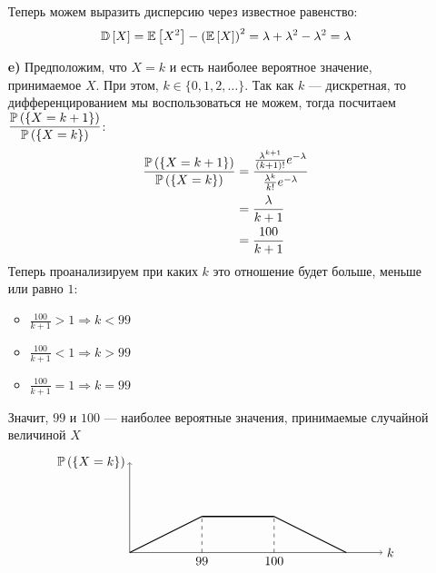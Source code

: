 \documentclass{article}
\begin{document}
\begin{enumerate}
    Теперь можем выразить дисперсию через известное равенство:
    \begin{equation*}
        \mathbb{D}\left[X\right]=\mathbb{E}\left[X^2\right]-\left(\mathbb{E}\left[X\right]\right)^2=\lambda+\lambda^2-\lambda^2=\lambda
    \end{equation*}
    \item[\textbf{e)}] Предположим, что $X=k$ и есть наиболее вероятное значение, принимаемое $X$. При этом, $k\in\{0,1,2,\ldots\}$. Так как $k$ — дискретная, то дифференцированием мы воспользоваться не можем, тогда посчитаем $\displaystyle\frac{\mathbb{P}\left(\{X=k+1\}\right)}{\mathbb{P}\left(\{X=k\}\right)}$:
    \begin{equation*}
        \begin{aligned}
            \frac{\mathbb{P}\left(\{X=k+1\}\right)}{\mathbb{P}\left(\{X=k\}\right)}&=\frac{\frac{\lambda^{k+1}}{(k+1)!}e^{-\lambda}}{\frac{\lambda^{k}}{k!}e^{-\lambda}}\\
            &=\frac{\lambda}{k+1}\\
            &=\frac{100}{k+1}
        \end{aligned}
    \end{equation*}
    Теперь проанализируем при каких $k$ это отношение будет больше, меньше или равно $1$:
    \begin{itemize}
        \item $\displaystyle\frac{100}{k+1}>1\Longrightarrow k <99$
        \item $\displaystyle\frac{100}{k+1}<1\Longrightarrow k >99$
        \item $\displaystyle\frac{100}{k+1}=1\Longrightarrow k =99$
    \end{itemize}
    Значит, $99$ и $100$ — наиболее вероятные значения, принимаемые случайной величиной $X$
    $$
    \begin{tikzpicture}
        \draw[black, ->] (0,0) -- (0,2.5) node[black, left] {$\prob{\{X=k\}}$};
        \draw[black, ->] (0,0) -- (7,0) node[black, right] {$k$};
        \draw[black, thick] (0,0) -- (2,1);
        \draw[black, very thick] (2,1) -- (4,1);
        \draw[black, thick] (4,1) -- (6,0);
        \draw[black, dashed] (2,0) node[black, below] {$99$} -- (2,1);
        \draw[black, dashed] (4,0) node[black, below] {$100$} -- (4,1);
    \end{tikzpicture}
    $$
\end{enumerate}
\end{document}
